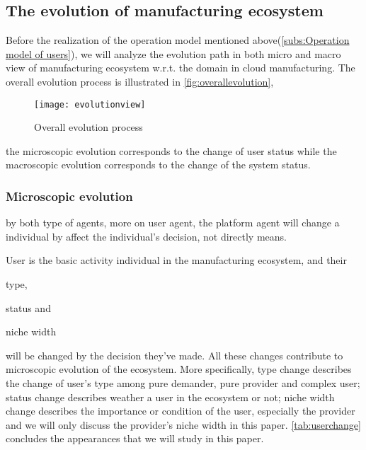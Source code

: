 \subsection{The evolution of manufacturing ecosystem} %
\label{sub:the_evolution_of_manufacturing_ecosystem}
Before the realization of the operation model mentioned above(\autoref{subs:Operation model of users}), we will analyze the evolution path in both micro and macro view of manufacturing ecosystem w.r.t. the domain in cloud manufacturing. The overall evolution process is illustrated in \autoref{fig:overallevolution},
\begin{figure}[htbp]
	\centering
	\texttt{[image: evolutionview]}
	\caption{Overall evolution process}
	\label{fig:overallevolution}
\end{figure}
the microscopic evolution corresponds to the change of user status while the macroscopic evolution corresponds to the change of the system status.

\subsubsection{Microscopic evolution} %
\label{ssub:microscopic_evolution}

by both type of agents, more on user agent, the platform agent will change a individual by affect the individual's decision, not directly means.

User is the basic activity individual in the manufacturing ecosystem, and their \begin{inparaenum}[1)]
\item type,
\item status and 
\item niche width
\end{inparaenum} will be changed by the decision they've made. 
All these changes contribute to microscopic evolution of the ecosystem. More specifically, type change describes the change of user's type among pure demander, pure provider and complex user; status change describes weather a user in the ecosystem or not; niche width change describes the importance or condition of the user, especially the provider and we will only discuss the provider's niche width in this paper. \autoref{tab:userchange} concludes the appearances that we will study in this paper.

